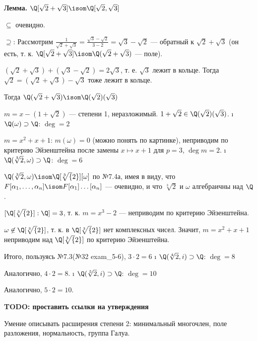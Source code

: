 \begin{solution}
\begin{itemize}
  \bf{Лемма.} $\Q[\sqrt2+\sqrt3] \isom \Q[\sqrt2, \sqrt3]$
  \begin{solution}
	$\subseteq$ очевидно.
	
	$\supseteq$: Рассмотрим $\frac{1}{\sqrt2+\sqrt3} = \frac{\sqrt3-\sqrt2}{3-2} = \sqrt3-\sqrt2$ --- обратный к $\sqrt2+\sqrt3$ (он есть, т. к. $\Q[\sqrt2+\sqrt3] \isom \Q(\sqrt2+\sqrt3)$ --- поле).
	
	$(\sqrt2+\sqrt3)+(\sqrt3-\sqrt2) = 2\sqrt3$, т. е. $\sqrt3$ лежит в кольце. Тогда $\sqrt2 = (\sqrt2+\sqrt3)-\sqrt3$ тоже лежит в кольце.
  \end{solution}
  
  Тогда $\Q(\sqrt2+\sqrt{3}) \isom \Q(\sqrt2)(\sqrt{3})$
  
  $m = x-(1+\sqrt2)$ --- степени 1, неразложимый. $1+\sqrt2 \in \Q(\sqrt2)(\sqrt{3})$.
\i
  \(\Q(\omega) \supset \Q\): \(\deg = 2\)
  
  $m = x^2+x+1$: $m(\omega) = 0$ (можно понять по картинке), неприводим по критерию Эйзенштейна после замены $x \mapsto x+1$ для $p=3$, $\deg m = 2$.
\i
  \(\Q(\sqrt[3]{2}, \omega) \supset \Q\): \(\deg = 6\)
  
  $\Q(\sqrt[3]{2}, \omega) \isom \Q[\sqrt[3]{2}][\omega]$ по №7.4а, имея в виду, что $F[\alpha_1, \dots, \alpha_n] \isom F[\alpha_1]\dots[\alpha_n]$ --- очевидно, и что $\sqrt[3]{2}$ и $\omega$ алгебраичны над $\Q$.
  
  $[\Q[\sqrt[3]{2}]:\Q] = 3$, т. к. $m = x^3-2$ --- неприводим по критерию Эйзенштейна.
  
  $\omega \not\in \Q[\sqrt[3]{2}]$, т. к. в $\Q[\sqrt[3]{2}]$ нет комплексных чисел. Значит, $m = x^2+x+1$ неприводим над $\Q[\sqrt[3]{2}]$ по критерию Эйзенштейна.
  
  Итого, пользуясь №7.3(№32 exam\_5-6), $3\cdot 2 = 6$
\i
  \(\Q(\sqrt[4]{2}, i) \supset \Q\): \(\deg = 8\)
  
  Аналогично, $4\cdot2 = 8$.
\i
  \(\Q(\sqrt[5]{2}, i) \supset \Q\): \(\deg = 10\)
  
  Аналогично, $5\cdot2 = 10$.
\end{itemize}

\bf{TODO: проставить ссылки на утверждения}
\end{solution}

\begin{problem}[35(6.10,8.9а,10.5)] Умение описывать расширения степени 2: минимальный многочлен, поле разложения, нормальность, группа Галуа.
\end{problem}


